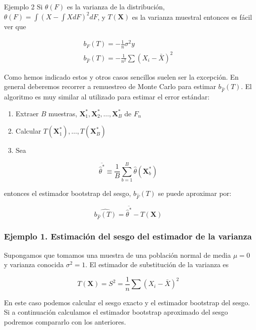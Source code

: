 \documentclass[
]{article}
\providecommand{\tightlist}{%
  \setlength{\itemsep}{0pt}\setlength{\parskip}{0pt}}
\begin{document}
Ejemplo 2 Si \(\theta(F)\) es la varianza de la distribución, \(\theta(F)=\int\left(X-\int X d F\right)^{2} d F\), y \(T(\mathbf{X})\) es la varianza muestral entonces es fácil ver que

\[
\begin{array}{r}
b_{F}(T)=-\frac{1}{n} \sigma^{2} y \\
b_{\hat{F}}(T)=-\frac{1}{n^{2}} \sum\left(X_{i}-\bar{X}\right)^{2}
\end{array}
\]

Como hemos indicado estos y otros casos sencillos suelen ser la excepción. En general deberemos recorrer a remuestreo de Monte Carlo para estimar \(b_{\hat{F}}(T)\). El algoritmo es muy similar al utilizado para estimar el error estándar:

\begin{enumerate}
\def\labelenumi{\arabic{enumi}.}
\tightlist
\item
  Extraer \(B\) muestras, \(\mathbf{X}_{1}^{*}, \mathbf{X}_{2}^{*}, \ldots, \mathbf{X}_{B}^{*}\) de \(F_{n}\)
\item
  Calcular \(T\left(\mathbf{X}_{1}^{*}\right), \ldots, T\left(\mathbf{X}_{B}^{*}\right)\)
\item
  Sea
\end{enumerate}

\[
\overline{\hat{\theta}^{*}} \equiv \frac{1}{B} \sum_{b=1}^{B} \hat{\theta}\left(\mathbf{X}_{b}^{*}\right)
\]

entonces el estimador bootstrap del sesgo, \(b_{\hat{F}}(T)\) se puede aproximar por:

\[
\widehat{b_{\hat{F}}(T)}=\overline{\hat{\theta}^{*}}-T(\mathbf{X})
\]

\subsubsection{Ejemplo 1. Estimación del sesgo del estimador de la varianza}\label{ejemplo-1.-estimaciuxf3n-del-sesgo-del-estimador-de-la-varianza}

Supongamos que tomamos una muestra de una población normal de media \(\mu=0\) y varianza conocida \(\sigma^{2}=1\). El estimador de substitución de la varianza es

\[
T(\mathbf{X})=S^{2}=\frac{1}{n} \sum\left(X_{i}-\bar{X}\right)^{2}
\]

En este caso podemos calcular el sesgo exacto y el estimador bootstrap del sesgo. Si a continuación calculamos el estimador bootstrap aproximado del sesgo podremos compararlo con los anteriores.
\end{document}

